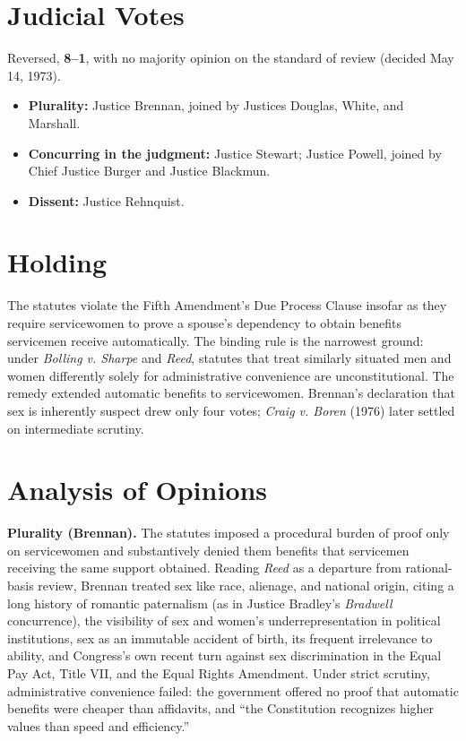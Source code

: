 \documentclass[12pt]{article}
\begin{document}
\section{Judicial Votes}

Reversed, \textbf{8--1}, with no majority opinion on the standard of review (decided May 14, 1973).
\begin{itemize}
\item \textbf{Plurality:} Justice Brennan, joined by Justices Douglas, White, and Marshall.
\item \textbf{Concurring in the judgment:} Justice Stewart; Justice Powell, joined by Chief Justice Burger and Justice Blackmun.
\item \textbf{Dissent:} Justice Rehnquist.
\end{itemize}

\section{Holding}

The statutes violate the Fifth Amendment's Due Process Clause insofar as they require servicewomen to prove a spouse's dependency to obtain benefits servicemen receive automatically. The binding rule is the narrowest ground: under \textit{Bolling v. Sharpe} and \textit{Reed}, statutes that treat similarly situated men and women differently solely for administrative convenience are unconstitutional. The remedy extended automatic benefits to servicewomen. Brennan's declaration that sex is inherently suspect drew only four votes; \textit{Craig v. Boren} (1976) later settled on intermediate scrutiny.

\section{Analysis of Opinions}

\textbf{Plurality (Brennan).} The statutes imposed a procedural burden of proof only on servicewomen and substantively denied them benefits that servicemen receiving the same support obtained. Reading \textit{Reed} as a departure from rational-basis review, Brennan treated sex like race, alienage, and national origin, citing a long history of romantic paternalism (as in Justice Bradley's \textit{Bradwell} concurrence), the visibility of sex and women's underrepresentation in political institutions, sex as an immutable accident of birth, its frequent irrelevance to ability, and Congress's own recent turn against sex discrimination in the Equal Pay Act, Title VII, and the Equal Rights Amendment. Under strict scrutiny, administrative convenience failed: the government offered no proof that automatic benefits were cheaper than affidavits, and ``the Constitution recognizes higher values than speed and efficiency.''
\end{document}
